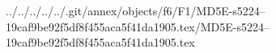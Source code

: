 ../../../../../.git/annex/objects/f6/F1/MD5E-s5224--19caf9be92f5df8f455aca5f41da1905.tex/MD5E-s5224--19caf9be92f5df8f455aca5f41da1905.tex